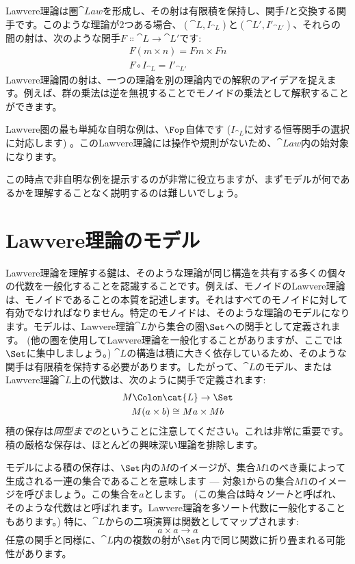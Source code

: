 Lawvere理論は圏$\cat{Law}$を形成し、その射は有限積を保持し、関手$I$と交換する関手です。このような理論が2つある場合、$(\cat{L}, I_{\cat{L}})$と$(\cat{L'}, I'_{\cat{L'}})$、それらの間の射は、次のような関手$F \Colon \cat{L} \to \cat{L'}$です: 
\begin{gather*}
  F (m \times n) = F m \times F n \\
  F \circ I_{\cat{L}} = I'_{\cat{L'}}
\end{gather*}
Lawvere理論間の射は、一つの理論を別の理論内での解釈のアイデアを捉えます。例えば、群の乗法は逆を無視することでモノイドの乗法として解釈することができます。

Lawvere圏の最も単純な自明な例は、$\Fop$自体です ($I_{\cat{L}}$に対する恒等関手の選択に対応します) 。このLawvere理論には操作や規則がないため、$\cat{Law}$内の始対象になります。

この時点で非自明な例を提示するのが非常に役立ちますが、まずモデルが何であるかを理解することなく説明するのは難しいでしょう。

\section{Lawvere理論のモデル}

Lawvere理論を理解する鍵は、そのような理論が同じ構造を共有する多くの個々の代数を一般化することを認識することです。例えば、モノイドのLawvere理論は、モノイドであることの本質を記述します。それはすべてのモノイドに対して有効でなければなりません。特定のモノイドは、そのような理論のモデルになります。モデルは、Lawvere理論$\cat{L}$から集合の圏$\Set$への関手として定義されます。 (他の圏を使用してLawvere理論を一般化することがありますが、ここでは$\Set$に集中しましょう。) $\cat{L}$の構造は積に大きく依存しているため、そのような関手は有限積を保持する必要があります。したがって、$\cat{L}$のモデル、またはLawvere理論$\cat{L}$上の代数は、次のように関手で定義されます: 
\begin{gather*}
  M \Colon \cat{L} \to \Set \\
  M (a \times b) \cong M a \times M b
\end{gather*}
積の保存は\emph{同型までの}ということに注意してください。これは非常に重要です。積の厳格な保存は、ほとんどの興味深い理論を排除します。

モデルによる積の保存は、$\Set$内の$M$のイメージが、集合$M 1$のべき乗によって生成される一連の集合であることを意味します --- 対象$1$からの集合$M 1$のイメージを呼びましょう。この集合を$a$とします。 (この集合は時々\emph{ソート}と呼ばれ、そのような代数はと呼ばれます。Lawvere理論を多ソート代数に一般化することもあります。) 特に、$\cat{L}$からの二項演算は関数としてマップされます: 
\[a \times a \to a\]
任意の関手と同様に、$\cat{L}$内の複数の射が$\Set$内で同じ関数に折り畳まれる可能性があります。

